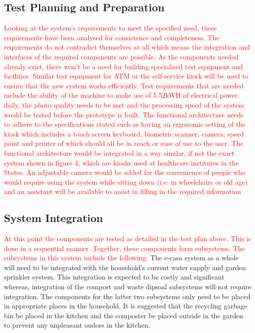 \documentclass[a4paper,11pt,fleqn]{report}
\begin{document}
\subsection{Test Planning and Preparation}
\textcolor{red}{Looking at the system’s requirements to meet the specified need, these requirements have been analysed for consistence and completeness. The requirements do not contradict themselves at all which means the integration and interfaces of the required components are possible. As the components needed already exist, there won’t be a need for building specialised test equipment and facilities. Similar test equipment for ATM or the self-service kiosk will be used to ensure that the new system works efficiently. Test requirements that are needed include the ability of the machine to make use of 5.52kWH of electrical power daily, the photo quality needs to be met and the processing speed of the system would be tested before the prototype is built. The functional architecture needs to adhere to the specifications stated such as having an ergonomic setting of the kiosk which includes a touch screen keyboard, biometric scanner, camera, speed point and printer of which should all be in reach or ease of use to the user. The functional architecture would be integrated in a way similar, if not the exact system shown in figure 4, which are kiosks used at healthcare institutes in the States. An adjustable camera would be added for the convenience of people who would require using the system while sitting down (i.e. in wheelchairs or old age) and an assistant will be available to assist in filling in the required information}

\subsection{System Integration}
\textcolor{red}{At this point the components are tested as detailed in the test plan above. This is done in a sequential manner. Together, these components form subsystems. The subsystems in this system include the following:}
The \ac{e-casa} system as a whole will need to be integrated with the household's current water supply and garden sprinkler system. This integration is expected to be costly and significant whereas, integration of the compost and waste dipsoal subsystems will not require integration. The components for the latter two subsystems only need to be placed in appropriate places in the household. It is suggested that the recycling garbage bin be placed in the kitchen and the composter be placed outside in the garden to prevent any unpleasant oudors in the kitchen.
\end{document}

